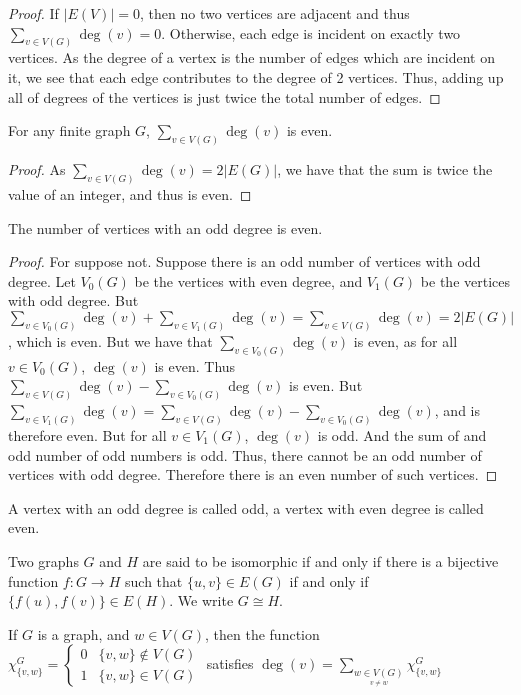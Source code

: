         \begin{proof}
        If $|E(V)| = 0$, then no two vertices are adjacent and thus $\sum_{v\in V(G)}\deg(v) = 0$. Otherwise, each edge is incident on exactly two vertices. As the degree of a vertex is the number of edges which are incident on it, we see that each edge contributes to the degree of 2 vertices. Thus, adding up all of degrees of the vertices is just twice the total number of edges.
        \end{proof}
        \begin{theorem}
        For any finite graph $G$, $\sum_{v\in V(G)}\deg(v)$ is even.
        \end{theorem}
        \begin{proof} As $\sum_{v\in V(G)}\deg(v) = 2|E(G)|$, we have that the sum is twice the value of an integer, and thus is even.
        \end{proof}
        \begin{theorem}
        The number of vertices with an odd degree is even.
        \end{theorem}
        \begin{proof}
        For suppose not. Suppose there is an odd number of vertices with odd degree. Let $V_0(G)$ be the vertices with even degree, and $V_1(G)$ be the vertices with odd degree. But $\sum_{v\in V_0(G)}\deg(v) + \sum_{v\in V_1(G)} \deg(v) = \sum_{v\in V(G)}\deg(v) = 2|E(G)|$, which is even. But we have that $\sum_{v\in V_0(G)}\deg(v)$ is even, as for all $v\in V_{0}(G)$, $\deg(v)$ is even. Thus $\sum_{v\in V(G)}\deg(v) - \sum_{v\in V_0(G)}\deg(v)$ is even. But $\sum_{v\in V_1(G)}\deg(v) = \sum_{v\in V(G)}\deg(v) - \sum_{v\in V_0(G)}\deg(v)$, and is therefore even. But for all $v\in V_1(G)$, $\deg(v)$ is odd. And the sum of and odd number of odd numbers is odd. Thus, there cannot be an odd number of vertices with odd degree. Therefore there is an even number of such vertices.
        \end{proof}
        \begin{definition}
        A vertex with an odd degree is called odd, a vertex with even degree is called even.
        \end{definition}
        \begin{definition}
        Two graphs $G$ and $H$ are said to be isomorphic if and only if there is a bijective function $f:G\rightarrow H$ such that $\{u,v\}\in E(G)$ if and only if $\{f(u),f(v)\}\in E(H)$. We write $G \cong H$.
        \end{definition}
        \begin{theorem}
        If $G$ is a graph, and $w\in V(G)$, then the function $\chi_{\{v,w\}}^G = \begin{cases} 0 & \{v,w\} \notin V(G) \\ 1 & \{v,w\} \in V(G) \end{cases}$ satisfies $\deg(v) = \sum_{\underset{v\ne w}{w\in V(G)}} \chi_{\{v,w\}}^G$
        \end{theorem}
